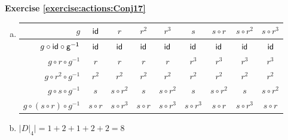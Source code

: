 \noindent\textbf{Exercise \ref{exercise:actions:Conj17}}
\begin{enumerate}[(a)]
\item
%
%
%
\begin{tabular}{ |r| c | c |c |c |c |c | c|c |} \hline
  $g$ &$\sf{id}$ & $r$ &$r^2$ &$r^3$ & $s$ &$s\circ r$ & $s\circ r ^2$ & $s\circ r^3$\\ \hline
  $g\circ \sf{id}\circ g^{-1}$ & $\sf{id}$ & $\sf{id}$ & $\sf{id}$ & $\sf{id}$ & $\sf{id}$ & $\sf{id}$ & $\sf{id}$ & $\sf{id}$ \\ \hline
  $g\circ r \circ g^{-1}$ & $r$ & $r$ & $r$ & $r$ & $r^3$ & $r^3$ & $r^3$ & $r^3$ \\ \hline
  $g\circ r^2 \circ g^{-1}$ & $r^2$ & $r^2$ & $r^2$ & $r^2$ & $r^2$ & $r^2$ & $r^2$ & $r^2$\\ \hline
  $g\circ s \circ g^{-1}$ & $s$ & $s \circ r^2$ & $s$ & $s \circ r^2$ & $s$ & $s \circ r^2$ & $s$ & $s \circ r^2$ \\ \hline
  $g\circ (s \circ r) \circ g^{-1}$ & $s \circ r$ & $s \circ r^3$ & $s \circ r$ & $s \circ r^3$ & $s \circ r^3$ & $s \circ r$ & $s \circ r^3$ & $s \circ r$ \\ \hline
\end{tabular}

\item 
$|D|_4| = 1 + 2 + 1 + 2 + 2 = 8$
\end{enumerate}

